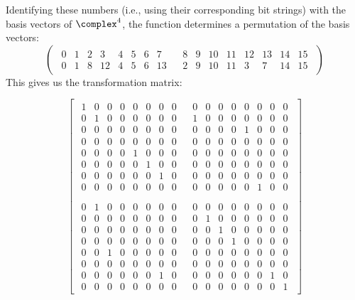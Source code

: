 Identifying these numbers (i.e., using their corresponding bit strings)
 with the basis vectors of $\complex^4$,
 the function determines a permutation of the basis
vectors:
\[\begin{pmatrix}
\begin{array}{cccccccc}
0&1&2&3&4&5&6&7\\
0&1&8&12&4&5&6&13
\end{array}&
\begin{array}{cccccccc}
8&9&10&11&12&13&14&15\\
2&9&10&11&3&7&14&15
\end{array}
\end{pmatrix}
\]
This gives us the transformation matrix:
{\begin{singlespace}
\[\begin{bmatrix}
\begin{array}{cccccccc}
1&0&0&0&0&0&0&0\\
0&1&0&0&0&0&0&0\\
0&0&0&0&0&0&0&0\\
0&0&0&0&0&0&0&0\\
0&0&0&0&1&0&0&0\\
0&0&0&0&0&1&0&0\\
0&0&0&0&0&0&1&0\\
0&0&0&0&0&0&0&0
\end{array} &
\begin{array}{cccccccc}
0&0&0&0&0&0&0&0\\
1&0&0&0&0&0&0&0\\
0&0&0&0&1&0&0&0\\
0&0&0&0&0&0&0&0\\
0&0&0&0&0&0&0&0\\
0&0&0&0&0&0&0&0\\
0&0&0&0&0&0&0&0\\
0&0&0&0&0&1&0&0
\end{array} \\
&\\
\begin{array}{cccccccc}
0&1&0&0&0&0&0&0\\
0&0&0&0&0&0&0&0\\
0&0&0&0&0&0&0&0\\
0&0&0&0&0&0&0&0\\
0&0&1&0&0&0&0&0\\
0&0&0&0&0&0&0&0\\
0&0&0&0&0&0&1&0\\
0&0&0&0&0&0&0&0
\end{array} &
\begin{array}{cccccccc}
0&0&0&0&0&0&0&0\\
0&1&0&0&0&0&0&0\\
0&0&1&0&0&0&0&0\\
0&0&0&1&0&0&0&0\\
0&0&0&0&0&0&0&0\\
0&0&0&0&0&0&0&0\\
0&0&0&0&0&0&1&0\\
0&0&0&0&0&0&0&1
\end{array} 
\end{bmatrix}
\]
\end{singlespace}
}


